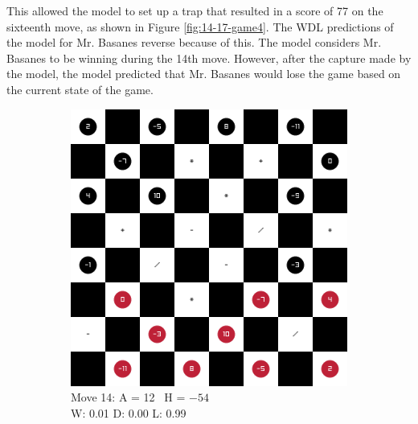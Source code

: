 This allowed the model to set up a trap that resulted in a score of 77 on the sixteenth move, as shown in Figure \ref{fig:14-17-game4}. The WDL predictions of the model for Mr. Basanes reverse because of this. The model considers Mr. Basanes to be winning during the 14th move. However, after the capture made by the model, the model predicted that Mr. Basanes would lose the game based on the current state of the game.

\begin{figure}[H]
\centering
    \begin{subfigure}{0.3\textwidth}
        \centering
        \includegraphics[width=\textwidth]{images/games/game4/move_14.png}
        \caption*{Move 14: A = 12 \textbar\ H = $-54$ \\ W: 0.01 D: 0.00 L: 0.99}
    \end{subfigure}
    \quad
    \begin{subfigure}{0.3\textwidth}
        \centering

\end{subfigure}
\end{figure}
